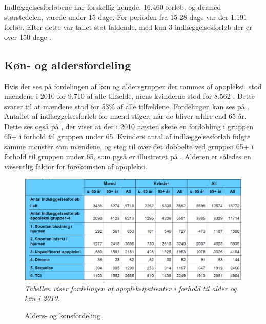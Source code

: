 Indlæggelsesforløbene har forskellig længde. 16.460 forløb, og dermed størstedelen, varede under 15 dage. For perioden fra 15-28 dage var der 1.191 forløb. Efter dette var tallet støt faldende, med kun 3 indlæggelsesforløb der er over 150 dage \cite{Sundhedsstyrelsen2011}.

\subsection{Køn- og aldersfordeling}
Hvis der ses på fordelingen af køn og aldersgrupper der rammes af apopleksi, stod mændene i 2010 for 9.710 af alle tilfælde, mens kvinderne stod for 8.562 \cite{Sundhedsstyrelsen2011}. Dette svarer til at mændene stod for 53\% af alle tilfældene. Fordelingen kan ses på .  
Antallet af indlæggelsesforløb for mænd stiger, når de bliver ældre end 65 år. Dette ses også på , der viser at der i 2010 næsten skete en fordobling i gruppen 65+ i forhold til gruppen under 65.
Kvinders antal af indlæggelsesforløb fulgte samme mønster som mændene, og steg til over det dobbelte ved gruppen 65+ i forhold til gruppen under 65, som pgså er illustreret på .\cite{Sundhedsstyrelsen2011} Alderen er således en væsentlig faktor for forekomsten af apopleksi.

\begin{figure}[H]
	\caption{Alders- og kønsfordeling}
	\label{AlderKoen}
	\centering
	\includegraphics[scale=.8]{figures/bProblemanalyse/MaendKvinder}
	\flushleft
	\textit{Tabellen viser fordelingen af apopleksipatienter i forhold til alder og køn i 2010.}
\end{figure}


